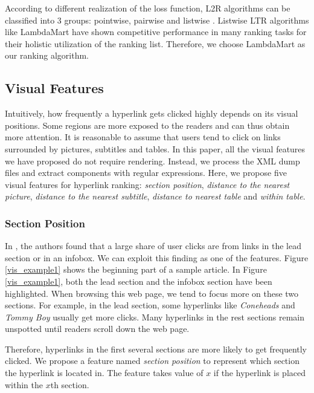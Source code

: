 According to different realization of the loss function, L2R algorithms can be classified into 3 groups: pointwise, pairwise and listwise \cite{liu2011learning}. Listwise LTR algorithms like LambdaMart \cite{wu2010adapting} have shown competitive performance in many ranking tasks for their holistic utilization of the ranking list. Therefore, we choose LambdaMart as our ranking algorithm. 

\subsection{Visual Features}

Intuitively, how frequently a hyperlink gets clicked highly depends on its visual positions. Some regions are more exposed to the readers and can thus obtain more attention. It is reasonable to assume that users tend to click on links surrounded by pictures, subtitles and tables. In this paper, all the visual features we have proposed do not require rendering. Instead, we process the XML dump files and extract components with regular expressions. Here, we propose five visual features for hyperlink ranking: \emph{section position}, \emph{distance to the nearest picture}, \emph{distance to the nearest subtitle}, \emph{distance to nearest table} and \emph{within table}.

\subsubsection{Section Position}

In \cite{lamprecht2017structure}, the authors found that a large share of user clicks are from links in the lead section or in an infobox. We can exploit this finding as one of the features. Figure \ref{vis_example1} shows the beginning part of a sample article. In Figure \ref{vis_example1}, both the lead section and the infobox section have been highlighted. When browsing this web page, we tend to focus more on these two sections. For example, in the lead section, some hyperlinks like \emph{Coneheads} and \emph{Tommy Boy} usually get more clicks. Many hyperlinks in the rest sections remain unspotted until readers scroll down the web page. 

Therefore, hyperlinks in the first several sections are more likely to get frequently clicked. We propose a feature named \emph{section position} to represent which section the hyperlink is located in. The feature takes value of $x$ if the hyperlink is placed within the $x$th section.

